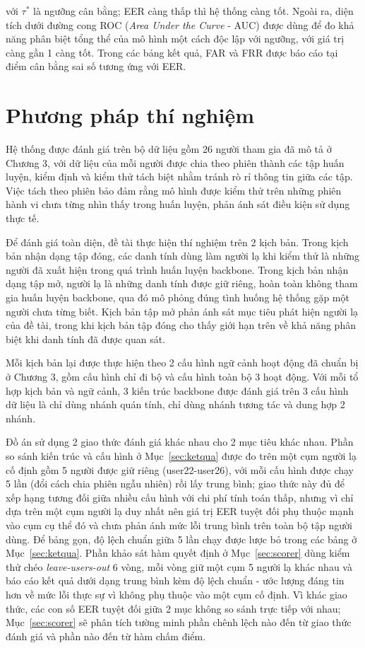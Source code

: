 \documentclass[../DoAn.tex]{subfiles}
\begin{document}
với $\tau^*$ là ngưỡng cân bằng; EER càng thấp thì hệ thống càng tốt. Ngoài ra, diện tích dưới đường cong ROC (\textit{Area Under the Curve} - AUC) được dùng để đo khả năng phân biệt tổng thể của mô hình một cách độc lập với ngưỡng, với giá trị càng gần 1 càng tốt. Trong các bảng kết quả, FAR và FRR được báo cáo tại điểm cân bằng sai số tương ứng với EER.

\section{Phương pháp thí nghiệm}
\label{sec:thinghiem}

Hệ thống được đánh giá trên bộ dữ liệu gồm 26 người tham gia đã mô tả ở Chương 3, với dữ liệu của mỗi người được chia theo phiên thành các tập huấn luyện, kiểm định và kiểm thử tách biệt nhằm tránh rò rỉ thông tin giữa các tập. Việc tách theo phiên bảo đảm rằng mô hình được kiểm thử trên những phiên hành vi chưa từng nhìn thấy trong huấn luyện, phản ánh sát điều kiện sử dụng thực tế.

Để đánh giá toàn diện, đề tài thực hiện thí nghiệm trên 2 kịch bản. Trong kịch bản nhận dạng tập đóng, các danh tính dùng làm người lạ khi kiểm thử là những người đã xuất hiện trong quá trình huấn luyện backbone. Trong kịch bản nhận dạng tập mở, người lạ là những danh tính được giữ riêng, hoàn toàn không tham gia huấn luyện backbone, qua đó mô phỏng đúng tình huống hệ thống gặp một người chưa từng biết. Kịch bản tập mở phản ánh sát mục tiêu phát hiện người lạ của đề tài, trong khi kịch bản tập đóng cho thấy giới hạn trên về khả năng phân biệt khi danh tính đã được quan sát.

Mỗi kịch bản lại được thực hiện theo 2 cấu hình ngữ cảnh hoạt động đã chuẩn bị ở Chương 3, gồm cấu hình chỉ đi bộ và cấu hình toàn bộ 3 hoạt động. Với mỗi tổ hợp kịch bản và ngữ cảnh, 3 kiến trúc backbone được đánh giá trên 3 cấu hình dữ liệu là chỉ dùng nhánh quán tính, chỉ dùng nhánh tương tác và dung hợp 2 nhánh.

Đồ án sử dụng 2 giao thức đánh giá khác nhau cho 2 mục tiêu khác nhau. Phần so sánh kiến trúc và cấu hình ở Mục~\ref{sec:ketqua} được đo trên một cụm người lạ cố định gồm 5 người được giữ riêng (user22-user26), với mỗi cấu hình được chạy 5 lần (đổi cách chia phiên ngẫu nhiên) rồi lấy trung bình; giao thức này đủ để xếp hạng tương đối giữa nhiều cấu hình với chi phí tính toán thấp, nhưng vì chỉ dựa trên một cụm người lạ duy nhất nên giá trị EER tuyệt đối phụ thuộc mạnh vào cụm cụ thể đó và chưa phản ánh mức lỗi trung bình trên toàn bộ tập người dùng. Để bảng gọn, độ lệch chuẩn giữa 5 lần chạy được lược bỏ trong các bảng ở Mục~\ref{sec:ketqua}. Phần khảo sát hàm quyết định ở Mục~\ref{sec:scorer} dùng kiểm thử chéo \textit{leave-users-out} 6 vòng, mỗi vòng giữ một cụm 5 người lạ khác nhau và báo cáo kết quả dưới dạng trung bình kèm độ lệch chuẩn - ước lượng đáng tin hơn về mức lỗi thực sự vì không phụ thuộc vào một cụm cố định. Vì khác giao thức, các con số EER tuyệt đối giữa 2 mục không so sánh trực tiếp với nhau; Mục~\ref{sec:scorer} sẽ phân tích tường minh phần chênh lệch nào đến từ giao thức đánh giá và phần nào đến từ hàm chấm điểm.
\end{document}
